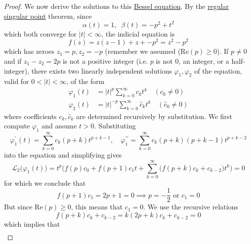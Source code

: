 \documentclass{article}
\newcounter{theorem}[section]
\begin{document}
      \begin{proof}
      We now derive the solutions to this \hyperref[def:bessel-equation]{Bessel equation}. By the \hyperref[def:regular-singular-point]{regular singular point} theorem, since
      \begin{equation}
        \alpha (t) = 1, \;\; \beta(t) = -p^2 + t^2
      \end{equation}
      which both converge for $|t|<\infty$, the indicial equation is 
      \begin{equation}
        f(z) = z(z-1) + z + -p^2 = z^2 - p^2
      \end{equation}
      which has zeroes $z_1 = p, z_2 = -p$ (remember we assumed (Re$(p) \geq 0$). If $p \neq 0$ and if $z_1 - z_2 = 2p$ is not a positive integer (i.e. $p$ is not $0$, an integer, or a half-integer), there exists two linearly independent solutions $\varphi_1, \varphi_2$ of the equation, valid for $0<|t|<\infty$, of the form
      \begin{align*}
          \varphi_1 (t) & = |t|^p \sum_{k=0}^\infty c_k t^k \quad (c_0 \neq 0) \\
          \varphi_2 (t) & = |t|^{-p} \sum_{k=0}^\infty \hat{c}_k t^k \quad (\hat{c}_0 \neq 0)
      \end{align*}
      where coefficients $c_k, \hat{c}_k$ are determined recursively by substitution. We first compute $\varphi_1$ and assume $t>0$. Substituting
      \begin{equation}
        \varphi_1^\prime (t) = \sum_{k=0}^\infty c_k (p+k) t^{p+k-1}, \quad \varphi_1^{\prime\prime} = \sum_{k=0}^\infty c_k (p+k) (p+k-1) t^{p+k-2}
      \end{equation}
      into the equation and simplifying gives
      \begin{equation}
        \mathcal{L}_2 \big( \varphi_1 (t)\big) = t^p \bigg( f(p) c_0 + f(p+1) c_1 t + \sum_{k=0}^\infty \big( f(p+k) c_k + c_{k-2}\big) t^k \bigg) = 0
      \end{equation}
      for which we conclude that 
      \begin{equation}
        f(p+1) c_1 = 2p + 1 = 0 \implies p = -\frac{1}{2} \text{ or } c_1 = 0
      \end{equation}
      But since Re$(p)\geq 0$, this means that $c_1 = 0$. We use the recursive relations
      \begin{equation}
        f(p+k) c_k + c_{k-2} = k (2p+k) c_k + c_{k-2} = 0
      \end{equation}
      which implies that
      \begin{align*}

\end{align*}
\end{proof}
\end{document}
